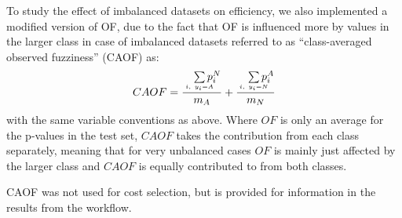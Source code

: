 \documentclass[10pt,article]{memoir}
\begin{document}
To study the effect of imbalanced datasets on efficiency, we also implemented a
modified version of OF, due to the fact that OF is influenced more
by values in the larger class in case of imbalanced datasets referred to as
``class-averaged
observed fuzziness'' (CAOF) as:
\begin{equation}
CAOF = \frac
        {\quad\sum\limits_{\mathclap{\substack{\scriptscriptstyle i,\ y_i=A}}}p_i^N}
        {m_A}
       + \frac 
        {\quad\sum\limits_{\mathclap{\substack{\scriptscriptstyle i,\ y_i=N}}}p_i^A}
        {m_N} 
\end{equation}
with the same variable conventions as above. Where $OF$ is only an average for
the p-values in the test set, $CAOF$ takes the contribution from each class
separately, meaning that for very unbalanced cases $OF$ is mainly just affected
by the larger class and $CAOF$ is equally contributed to from both classes.



CAOF was not used for cost selection, but is provided for information in the
results from the workflow.
\end{document}
